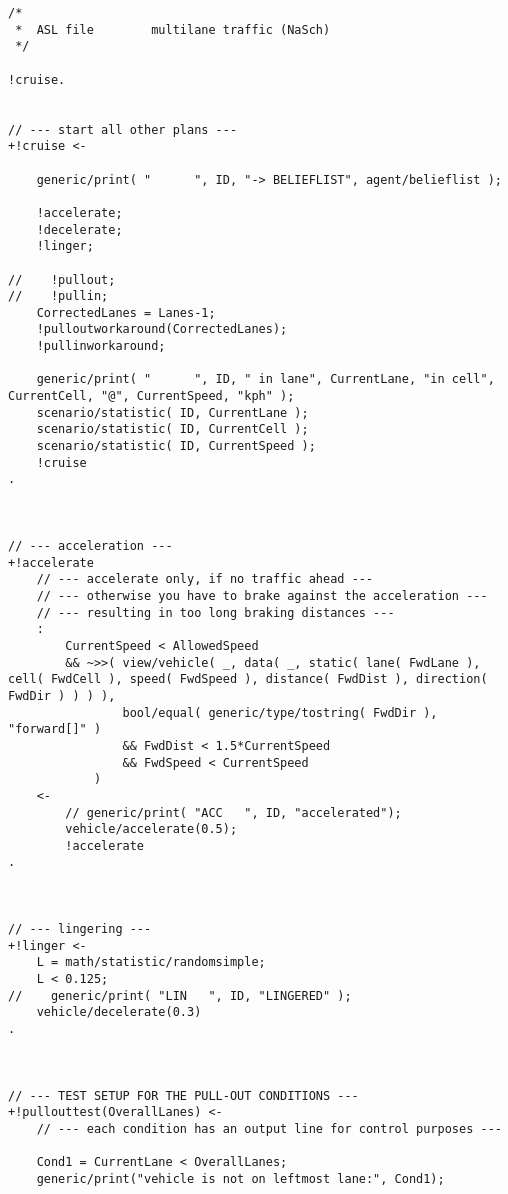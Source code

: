 \begin{lstlisting}[style=asl, 
                   keywords={+!cruise,+!accelerate,+!linger,+!decelerate,+!vehicle/collision}, 
                   keywords={[2]}, 
                   keywords={[3]}, 
                   caption={Agentenscript: NaSch-Modell, mehrspurig},
                   label={lst:multi-lane}]      
/*
 *  ASL file        multilane traffic (NaSch)
 */

!cruise.


// --- start all other plans ---
+!cruise <-
    
    generic/print( "      ", ID, "-> BELIEFLIST", agent/belieflist );
    
    !accelerate;
    !decelerate;
    !linger;
    
//    !pullout;
//    !pullin;
    CorrectedLanes = Lanes-1;
    !pulloutworkaround(CorrectedLanes);
    !pullinworkaround;

    generic/print( "      ", ID, " in lane", CurrentLane, "in cell", CurrentCell, "@", CurrentSpeed, "kph" );
    scenario/statistic( ID, CurrentLane );
    scenario/statistic( ID, CurrentCell );
    scenario/statistic( ID, CurrentSpeed );
    !cruise
.



// --- acceleration ---
+!accelerate
    // --- accelerate only, if no traffic ahead ---
    // --- otherwise you have to brake against the acceleration ---
    // --- resulting in too long braking distances ---
    : 
        CurrentSpeed < AllowedSpeed
        && ~>>( view/vehicle( _, data( _, static( lane( FwdLane ), cell( FwdCell ), speed( FwdSpeed ), distance( FwdDist ), direction( FwdDir ) ) ) ),
                bool/equal( generic/type/tostring( FwdDir ), "forward[]" )
                && FwdDist < 1.5*CurrentSpeed
                && FwdSpeed < CurrentSpeed
            )
    <-
        // generic/print( "ACC   ", ID, "accelerated");
        vehicle/accelerate(0.5);
        !accelerate
.



// --- lingering ---
+!linger <-
    L = math/statistic/randomsimple;
    L < 0.125;
//    generic/print( "LIN   ", ID, "LINGERED" );
    vehicle/decelerate(0.3)
.



// --- TEST SETUP FOR THE PULL-OUT CONDITIONS ---
+!pullouttest(OverallLanes) <-
    // --- each condition has an output line for control purposes ---

    Cond1 = CurrentLane < OverallLanes; 
    generic/print("vehicle is not on leftmost lane:", Cond1); 


\end{lstlisting}
